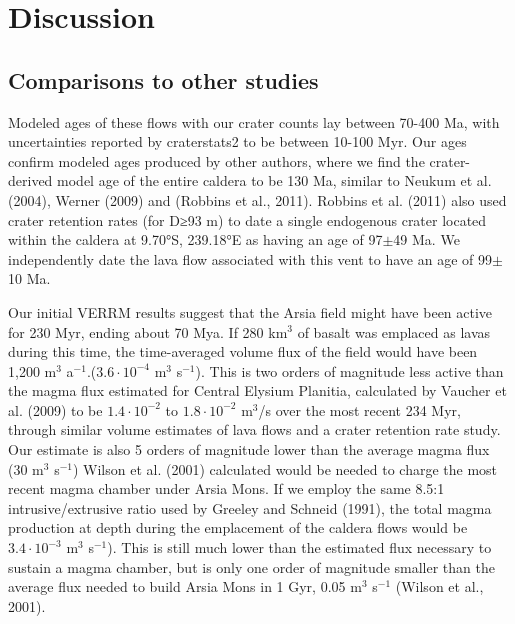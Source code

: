 \documentclass[12pt,letter]{article}
\begin{document}
\section{Discussion}

\subsection{Comparisons to other studies}

Modeled ages of these flows with our crater counts lay between 70-400 Ma, with uncertainties reported by craterstats2 to be between 10-100 Myr. Our ages confirm modeled ages produced by other authors, where we find the crater-derived model age of the entire caldera to be 130 Ma, similar to  Neukum et al. (2004), Werner (2009) and (Robbins et al., 2011). Robbins et al. (2011) also used crater retention rates (for D≥93 m) to date a single endogenous crater located within the caldera at 9.70°S, 239.18°E as having an age of 97$\pm$49 Ma. We independently date the lava flow associated with this vent to have an age of 99$\pm$10 Ma.

Our initial VERRM results suggest that the Arsia field might have been active for 230 Myr, ending about 70 Mya. If 280 km$^3$ of basalt was emplaced as lavas during this time, the time-averaged volume flux of the field would have been 1,200 m$^3$ a$^{-1}$.($3.6\cdot 10^{-4}$ m$^3$ s$^{-1}$). This is two orders of magnitude less active than the magma flux estimated for Central Elysium Planitia, calculated by Vaucher et al. (2009) to be $1.4\cdot 10^{-2}$ to $1.8\cdot 10^{-2}$ m$^3$/s over the most recent 234 Myr, through similar volume estimates of lava flows and a crater retention rate study. Our estimate is also 5 orders of magnitude lower than the average magma flux (30 m$^3$ s$^{-1}$) Wilson et al. (2001) calculated would be needed to charge the most recent magma chamber under Arsia Mons. If we employ the same 8.5:1 intrusive/extrusive ratio used by Greeley and Schneid (1991), the total magma production at depth during the emplacement of the caldera flows would be $3.4\cdot 10^{-3}$ m$^3$ s$^{-1}$). This is still much lower than the estimated flux necessary to sustain a magma chamber, but is only one order of magnitude smaller than the average flux needed to build Arsia Mons in 1 Gyr, 0.05 m$^3$ s$^{-1}$ (Wilson et al., 2001).
\end{document}
